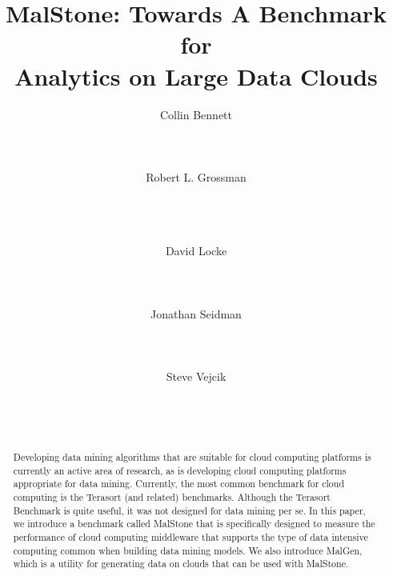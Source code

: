 \documentclass{acm_proc_article-sp}
\def\malstone{MalStone } \def\malgen{MalGen }
\def\malstonens{MalStone} \def\malgenns{MalGen}
\begin{document}
\title{\malstonens: Towards A Benchmark for \protect\\ 
Analytics on Large Data Clouds}

 \author{
\alignauthor Collin Bennett \\
  \\
  \\
  \\
 \alignauthor Robert L. Grossman \\
  \\
  \\
  \\
 \and \alignauthor David Locke\\
  \\
  \\
  \\
 \alignauthor Jonathan Seidman \\
  \\
  \\
  \\
 \alignauthor Steve Vejcik\\
  \\
  \\
  \\
}

\maketitle

\begin{abstract}
Developing data mining algorithms that are suitable for cloud
computing platforms is currently an active area of research, as
is developing cloud computing platforms appropriate for data mining.
Currently, the most common benchmark for cloud computing is the
Terasort (and related) benchmarks.  Although the Terasort Benchmark
is quite useful, it was not designed for data mining per se.  In this paper,
we introduce a benchmark called \malstone  that is specifically
designed to measure the performance of cloud computing middleware
that supports the type of data intensive computing common
when building data mining models.  We also introduce \malgenns, which
is a utility for generating data on clouds that can be used with
\malstonens.  
\end{abstract}
\end{document}
